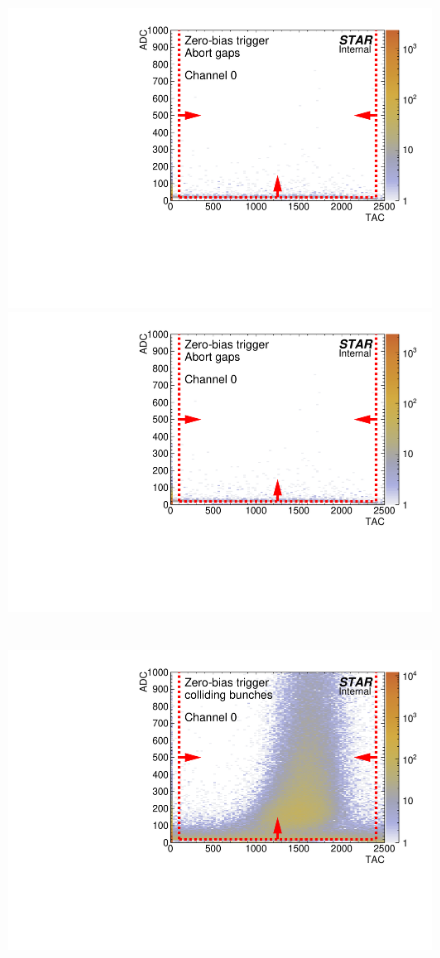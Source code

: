 \begin{figure}[hb]
{  \includegraphics[width=\linewidth,page=3]{graphics/eventSelection/bbc/Bbc_ADCvsTAC_abortGaps.pdf}\\
  \includegraphics[width=\linewidth,page=4]{graphics/eventSelection/bbc/Bbc_ADCvsTAC_abortGaps.pdf}
}~
\parbox{0.327\textwidth}{
  \centering
  \includegraphics[width=\linewidth,page=1]{graphics/eventSelection/bbc/Bbc_ADCvsTAC_collidingBunches.pdf}\\
}
\end{figure}
